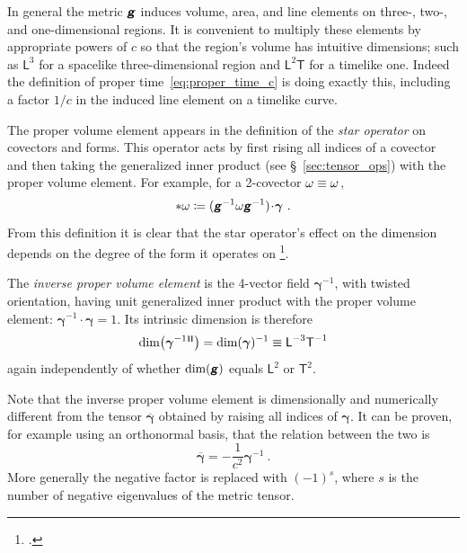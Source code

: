 \documentclass[\ifafour a4paper,12pt,\else a5paper,10pt,\fi%
onecolumn,oneside,article,%
british%
]{memoir}
\makeatletter
\theoremstyle{remark}
\theoremstyle{innote}
\newcommand*{\mathte}[1]{\textbf{\textit{\textsf{#1}}}}
\newcommand*{\citep}{\footcites}
\newcommand*{\defd}{\coloneqq}
\DeclarePairedDelimiter\abs{\lvert}{\rvert}
\renewcommand*{\|}[1][]{\nonscript\,#1\vert\nonscript\;\mathopen{}}
\newcommand*{\sect}{\S}%
\newcommand*{\sects}{\S\S}%
\newcommand*{\chap}{ch.}%
\newcommand*{\cf}{{cf.}}
\newcommand*{\q}{}%
\DeclareRobustCommand*{\q}{%
  \mathord{\mathpalette\bigcdot@{}}%
}
\newcommand*{\bigcdot@scalefactor}{0.7}
\newcommand*{\bigcdot@widthfactor}{1.5}
\newcommand*{\bigcdot@}[2]{%
  \sbox0{$#1\vcenter{}$}%
  \sbox2{$#1\cdot\m@th$}%
  \hbox to \bigcdot@widthfactor\wd2{%
    \hfil
    \raise\ht0\hbox{%
      \scalebox{\bigcdot@scalefactor}{%
        \lower\ht0\hbox{$#1\bullet\m@th$}%
      }%
    }%
    \hfil
  }%
}
\newcommand*{\Le}{\textsf{L}}
\newcommand*{\Ti}{\textsf{T}}
\newcommand*{\Li}{\textsf{L}}
\newcommand*{\ii}{\mathbin{\!\cdot\!}}
\newcommand*{\yg}{\mathte{g}}
\renewcommand*{\i}{\indices}
\newcommand*{\ygv}{\bm{\gamma}}
\newcommand*{\ygu}{\overline{\ygv}}
\newcommand*{\rul}{{\mkern2mu\rule[-0.1ex]{0.75pt}{1.1ex}\mkern2mu}}
\DeclarePairedDelimiter\mul{\rul}{\rul}%
\makeatother
\begin{document}
In general the metric $\yg$ induces volume, area, and line elements on
three-, two-, and one-dimensional regions. It is convenient to multiply
these elements by appropriate powers of $c$ so that the region's volume has
intuitive dimensions; such as $\Li^{3}$ for a spacelike three-dimensional
region and $\Li^{2}\Ti$ for a timelike one. Indeed the definition of proper
time~\eqref{eq:proper_time_c} is doing exactly this, including a factor
$1/c$ in the induced line element on a timelike curve.

The proper volume element appears in the definition of the \emph{star
  operator} on covectors and forms. This operator acts by first rising all
indices of a covector and then taking the generalized inner product (see
\sect~\ref{sec:tensor_ops}) with the proper volume element. For example,
for a 2-covector $\omega \equiv \omega\i{_{\q\q}}$,
\begin{equation}
  \label{eq:star_op}
  *\omega \defd (\yg^{-1}\omega\yg^{-1})\ii\ygv \ .
\end{equation}
From this definition it is clear that the star operator's effect on the
dimension depends on the degree of the form it operates on \citep[I
personally prefer to avoid the star operator and explicitly use the inner
product with the proper volume element; \cf][\sects~4.1--2]{bossavit1991}.

The \emph{inverse proper volume element} is the 4-vector field $\ygv^{-1}$,
with twisted orientation, having unit generalized inner product with the
proper volume element: $\ygv^{-1} \ii \ygv = 1$. Its intrinsic dimension is
therefore
\begin{equation}
  \label{eq:dim_inv_volume_elem}
  \dim\bigl(\ygv^{-1}{}\i{^{\mul{\q\q\q\q}}}\bigr) =
  \dim(\ygv)^{-1} \equiv \Le^{-3}\Ti^{-1}
\end{equation}
again independently of whether $\dim(\yg)$ equals $\Li^{2}$ or $\Ti^{2}$.

Note that the inverse proper volume element is dimensionally and
numerically different from the tensor $\ygu$ obtained by raising all
indices of $\ygv$. It can be proven, for example using an orthonormal
basis, that the relation between the two is
\begin{equation}
  \label{eq:relation_volumes}
  \ygu = -\frac{1}{c^{2}} \ygv^{-1} \ .
\end{equation}
More generally the negative factor is replaced with $(-1)^{s}$, where $s$ is
the number of negative eigenvalues of the metric tensor.


\end{document}
